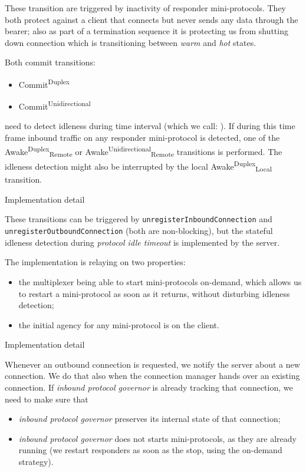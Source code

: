 \documentclass{article}
\def\CommitDup{\textsf{Commit}\textsuperscript{\textsf{Duplex}}}
\def\CommitUni{\textsf{Commit}\textsuperscript{\textsf{Unidirectional}}}
\def\AwakeDupRem{\textsf{Awake}\textsuperscript{\textsf{Duplex}}\textsubscript{\textsf{Remote}}}
\def\AwakeUniRem{\textsf{Awake}\textsuperscript{\textsf{Unidirectional}}\textsubscript{\textsf{Remote}}}
\def\AwakeDupLoc{\textsf{Awake}\textsuperscript{\textsf{Duplex}}\textsubscript{\textsf{Local}}}
\def\warm{\textit{warm}}
\def\hot{\textit{hot}}
\def\inbgov{\textit{inbound protocol governor}}
\newenvironment{detail}
  {
    \begin{center}
    \begin{minipage}{0.9\textwidth}
      \begin{shaded}
      \small
      \noindent Implementation detail
      \vspace{0.3em}
      \newline
      \itshape
  }
  {
  \end{shaded}
  \end{minipage}
  \end{center}
  \vspace{1em}
  }
\begin{document}
These transition are triggered by inactivity of responder mini-protocols.  They
both protect against a client that connects but never sends any data through
the bearer; also as part of a termination sequence it is protecting us from
shutting down connection which is transitioning between \warm{} and \hot{}
states.

Both commit transitions:
\begin{itemize}
  \item \CommitDup{}
  \item \CommitUni{}
\end{itemize}
need to detect idleness during time interval (which we call: ).  If during this time frame inbound traffic on any responder
mini-protocol is detected, one of the \AwakeDupRem{} or \AwakeUniRem{}
transitions is performed.  The idleness detection might also be interrupted by
the local \AwakeDupLoc{} transition.

\begin{detail}
  These transitions can be triggered by \texttt{unregisterInboundConnection} and
  \texttt{unregisterOutboundConnection} (both are non-blocking), but the
  stateful idleness detection during \textit{protocol idle timeout} is
  implemented by the server.

  The implementation is relaying on two properties:
  \begin{itemize}
    \item the multiplexer being able to start mini-protocols on-demand, which
      allows us to restart a mini-protocol as soon as it returns, without
      disturbing idleness detection;
    \item the initial agency for any mini-protocol is on the client.
  \end{itemize}
\end{detail}

\begin{detail}
  Whenever an outbound connection is requested, we notify the server about
  a new connection.  We do that also when the connection manager hands over an
  existing connection.  If \inbgov{} is already tracking that connection,
  we need to make sure that
  \begin{itemize}
    \item \inbgov{} preserves its internal state of that connection;
    \item \inbgov{} does not starts mini-protocols, as they are already running
      (we restart responders as soon as the stop, using the on-demand
      strategy).
  \end{itemize}
\end{detail}
\end{document}
